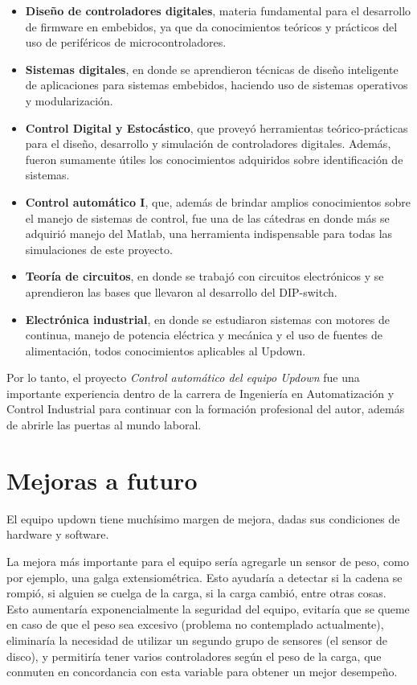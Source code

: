 \begin{itemize}
	\item \textbf{Diseño de controladores digitales}, materia fundamental para el desarrollo de firmware en embebidos, ya que da conocimientos teóricos y prácticos del uso de periféricos de microcontroladores. 
	\item \textbf{Sistemas digitales}, en donde se aprendieron técnicas de diseño inteligente de aplicaciones para sistemas embebidos, haciendo uso de sistemas operativos y modularización.	
	\item \textbf{Control Digital y Estocástico}, que proveyó herramientas teórico-prácticas para el diseño, desarrollo y simulación de controladores digitales. Además, fueron sumamente útiles los conocimientos adquiridos sobre identificación de sistemas.
	\item \textbf{Control automático I}, que, además de brindar amplios conocimientos sobre el manejo de sistemas de control, fue una de las cátedras en donde más se adquirió manejo del Matlab, una herramienta indispensable para todas las simulaciones de este proyecto.
	\item \textbf{Teoría de circuitos}, en donde se trabajó con circuitos electrónicos y se aprendieron las bases que llevaron al desarrollo del DIP-switch.
	\item \textbf{Electrónica industrial}, en donde se estudiaron sistemas con motores de continua, manejo de potencia eléctrica y mecánica y el uso de fuentes de alimentación, todos conocimientos aplicables al Updown.
\end{itemize}

Por lo tanto, el proyecto \textit{Control automático del equipo Updown} fue una importante experiencia dentro de la carrera de Ingeniería en Automatización y Control Industrial para continuar con la formación profesional del autor, además de abrirle las puertas al mundo laboral. 
 
\section{Mejoras a futuro} \label{sec:\thesection}

El equipo updown tiene muchísimo margen de mejora, dadas sus condiciones de hardware y software. 

La mejora más importante para el equipo sería agregarle un sensor de peso, como por ejemplo, una galga extensiométrica. Esto ayudaría a detectar si la cadena se rompió, si alguien se cuelga de la carga, si la carga cambió, entre otras cosas. Esto aumentaría exponencialmente la seguridad del equipo, evitaría que se queme en caso de que el peso sea excesivo (problema no contemplado actualmente), eliminaría la necesidad de utilizar un segundo grupo de sensores (el sensor de disco), y permitiría tener varios controladores según el peso de la carga, que conmuten en concordancia con esta variable para obtener un mejor desempeño.

